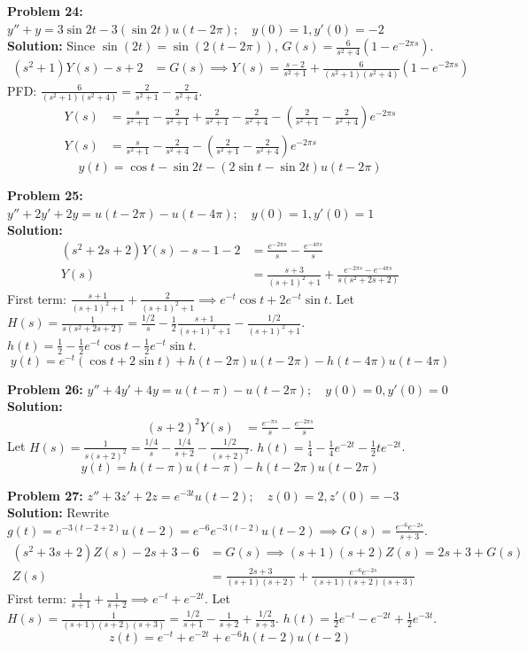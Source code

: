 \documentclass[11pt, letterpaper]{article}
\theoremstyle{definition}
\theoremstyle{remark}
\begin{document}
\textbf{Problem 24:} $y''+y = 3\sin 2t - 3(\sin 2t)u(t-2\pi); \quad y(0)=1, y'(0)=-2$
\\[4pt]
\textbf{Solution:}
Since $\sin(2t) = \sin(2(t-2\pi))$, $G(s) = \frac{6}{s^2+4}(1 - e^{-2\pi s})$.
\begin{align*}
(s^2+1)Y(s) - s + 2 &= G(s) \implies Y(s) = \frac{s-2}{s^2+1} + \frac{6}{(s^2+1)(s^2+4)}(1 - e^{-2\pi s})
\end{align*}
PFD: $\frac{6}{(s^2+1)(s^2+4)} = \frac{2}{s^2+1} - \frac{2}{s^2+4}$.
\begin{align*}
Y(s) &= \frac{s}{s^2+1} - \frac{2}{s^2+1} + \frac{2}{s^2+1} - \frac{2}{s^2+4} - \left(\frac{2}{s^2+1} - \frac{2}{s^2+4}\right)e^{-2\pi s} \\
Y(s) &= \frac{s}{s^2+1} - \frac{2}{s^2+4} - \left(\frac{2}{s^2+1} - \frac{2}{s^2+4}\right)e^{-2\pi s}
\end{align*}
\[
y(t) = \cos t - \sin 2t - (2\sin t - \sin 2t)u(t-2\pi)
\]

\textbf{Problem 25:} $y''+2y'+2y = u(t-2\pi) - u(t-4\pi); \quad y(0)=1, y'(0)=1$
\\[4pt]
\textbf{Solution:}
\begin{align*}
(s^2+2s+2)Y(s) - s - 1 - 2 &= \frac{e^{-2\pi s}}{s} - \frac{e^{-4\pi s}}{s} \\
Y(s) &= \frac{s+3}{(s+1)^2+1} + \frac{e^{-2\pi s} - e^{-4\pi s}}{s(s^2+2s+2)}
\end{align*}
First term: $\frac{s+1}{(s+1)^2+1} + \frac{2}{(s+1)^2+1} \implies e^{-t}\cos t + 2e^{-t}\sin t$.
Let $H(s) = \frac{1}{s(s^2+2s+2)} = \frac{1/2}{s} - \frac{1}{2}\frac{s+1}{(s+1)^2+1} - \frac{1/2}{(s+1)^2+1}$.
$h(t) = \frac{1}{2} - \frac{1}{2}e^{-t}\cos t - \frac{1}{2}e^{-t}\sin t$.
\[
y(t) = e^{-t}(\cos t + 2\sin t) + h(t-2\pi)u(t-2\pi) - h(t-4\pi)u(t-4\pi)
\]

\textbf{Problem 26:} $y''+4y'+4y = u(t-\pi) - u(t-2\pi); \quad y(0)=0, y'(0)=0$
\\[4pt]
\textbf{Solution:}
\begin{align*}
(s+2)^2 Y(s) &= \frac{e^{-\pi s}}{s} - \frac{e^{-2\pi s}}{s}
\end{align*}
Let $H(s) = \frac{1}{s(s+2)^2} = \frac{1/4}{s} - \frac{1/4}{s+2} - \frac{1/2}{(s+2)^2}$.
$h(t) = \frac{1}{4} - \frac{1}{4}e^{-2t} - \frac{1}{2}te^{-2t}$.
\[
y(t) = h(t-\pi)u(t-\pi) - h(t-2\pi)u(t-2\pi)
\]

\textbf{Problem 27:} $z''+3z'+2z = e^{-3t}u(t-2); \quad z(0)=2, z'(0)=-3$
\\[4pt]
\textbf{Solution:}
Rewrite $g(t) = e^{-3(t-2+2)}u(t-2) = e^{-6}e^{-3(t-2)}u(t-2) \implies G(s) = \frac{e^{-6}e^{-2s}}{s+3}$.
\begin{align*}
(s^2+3s+2)Z(s) - 2s + 3 - 6 &= G(s) \implies (s+1)(s+2)Z(s) = 2s + 3 + G(s) \\
Z(s) &= \frac{2s+3}{(s+1)(s+2)} + \frac{e^{-6}e^{-2s}}{(s+1)(s+2)(s+3)}
\end{align*}
First term: $\frac{1}{s+1} + \frac{1}{s+2} \implies e^{-t} + e^{-2t}$.
Let $H(s) = \frac{1}{(s+1)(s+2)(s+3)} = \frac{1/2}{s+1} - \frac{1}{s+2} + \frac{1/2}{s+3}$.
$h(t) = \frac{1}{2}e^{-t} - e^{-2t} + \frac{1}{2}e^{-3t}$.
\[
z(t) = e^{-t} + e^{-2t} + e^{-6}h(t-2)u(t-2)
\]
\end{document}

